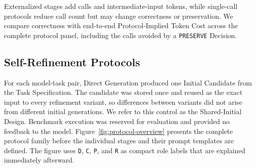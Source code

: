 Externalized stages add calls and intermediate-input tokens, while single-call protocols reduce call count but may change correctness or preservation.
We compare correctness with end-to-end Protocol-Implied Token Cost across the complete protocol panel, including the calls avoided by a \texttt{PRESERVE} Decision.

\subsection{Self-Refinement Protocols}

For each model-task pair, Direct Generation produced one Initial Candidate from the Task Specification.
The candidate was stored once and reused as the exact input to every refinement variant, so differences between variants did not arise from different initial generations.
We refer to this control as the Shared-Initial Design.
Benchmark execution was reserved for evaluation and provided no feedback to the model.
Figure~\ref{fig:protocol-overview} presents the complete protocol family before the individual stages and their prompt templates are defined.
The figure uses \texttt{D}, \texttt{C}, \texttt{P}, and \texttt{R} as compact role labels that are explained immediately afterward.

